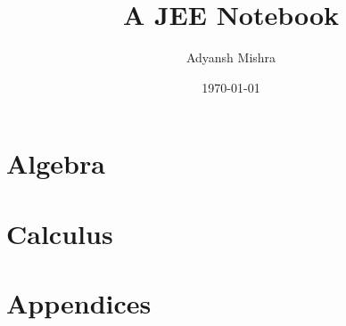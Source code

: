 \documentclass[twoside, a4paper, 10pt, bibliography=totoc, index=totoc, listof=totoc]{scrbook}
\begin{document}
    \author{Adyansh Mishra}
    \date{\today}
    \title{A JEE Notebook}
    \fncytitle

    \tableofcontents
     
    \frontmatter
    
    
    \mainmatter
    
    \part{Algebra}
    
    


    \part{Calculus}
    

    \part{Appendices}
    \restoregeometry

    \appendix
    
\end{document}
